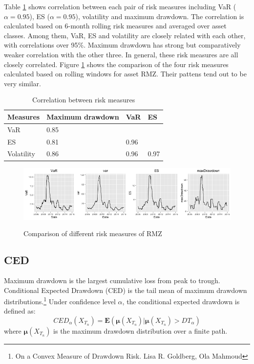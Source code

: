 \fi

Table \ref{table:corrRiskMeasure} shows correlation between each pair of risk measures including VaR ($\alpha = 0.95$), ES ($\alpha = 0.95$), volatility and maximum drawdown. The correlation is calculated based on 6-month rolling risk measures and averaged over asset classes. Among them, VaR, ES and volatility are closely related with each other, with correlations over 95\%. Maximum drawdown has strong but comparatively weaker correlation with the other three. In general, these risk measures are all closely correlated. Figure \ref{fig: risk_meausre_RMZ} shows the comparison of the four risk measures calculated based on rolling windows for asset RMZ. Their pattens tend out to be very similar.

\begin{table}[!h]
\caption{Correlation between risk measures}
\centering 
\begin{tabular}{ p{2cm}||p{2cm}|p{2cm}|p{2cm}} 
\hline
Measures & Maximum drawdown & VaR & ES\\
  \hline \hline
VaR & 0.85 & & \\
ES & 0.81 & 0.96 & \\
Volatility & 0.86 & 0.96 & 0.97  \\
\hline
\end{tabular}
\label{table:corrRiskMeasure}
\end{table}

\begin{figure}[h]
\caption{Comparison of different risk measures of RMZ} 
\centering 
\includegraphics[width = 1\textwidth]{../results/risk_measure_RMZ}
\label{fig: risk_meausre_RMZ}
\end{figure}


\subsection{CED}

Maximum drawdown is the largest cumulative loss from peak to trough. Conditional Expected Drawdown (CED) is the tail mean of maximum drawdown distributions.\footnote{On a Convex Measure of Drawdown Risk. Lisa R. Goldberg, Ola Mahmoud} Under confidence level $\alpha$, the conditional expected drawdown is defined as:
\begin{equation}
CED_\alpha(X_{T_n}) = \textbf{E}(\mathbf{\mu}(X_{T_n})|\mathbf{\mu}(X_{T_n}) > DT_\alpha)
\end{equation}
where $\mathbf{\mu}(X_{T_n})$ is the maximum drawdown distribution over a finite path.

